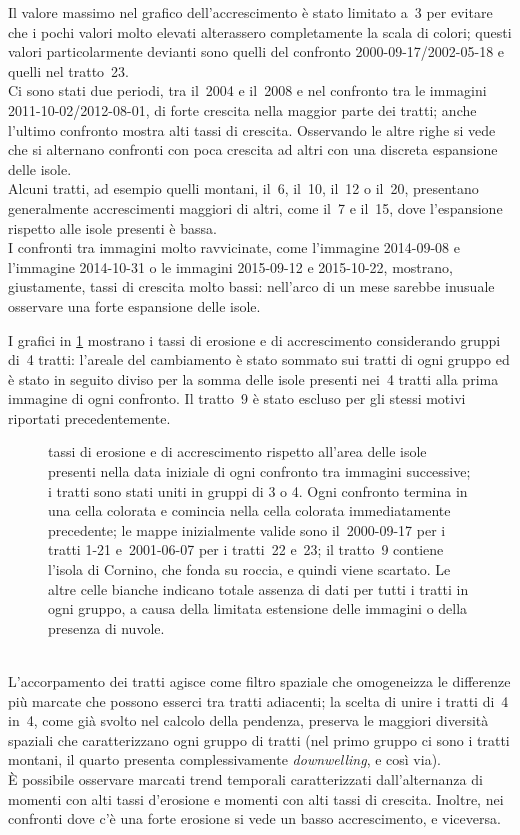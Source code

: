 Il valore massimo nel grafico dell'accrescimento è stato limitato a~\num{3} per evitare che i pochi valori molto elevati alterassero completamente la scala di colori; questi valori particolarmente devianti sono quelli del confronto 2000-09-17/2002-05-18 e quelli nel tratto~23.
\\
Ci sono stati due periodi, tra il~2004 e il~2008 e nel confronto tra le immagini 2011-10-02/2012-08-01, di forte crescita nella maggior parte dei tratti; anche l'ultimo confronto mostra alti tassi di crescita.
Osservando le altre righe si vede che si alternano confronti con poca crescita ad altri con una discreta espansione delle isole.
\\
Alcuni tratti, ad esempio quelli montani, il~6, il~10, il~12 o il~20, presentano generalmente accrescimenti maggiori di altri, come il~7 e il~15, dove l'espansione rispetto alle isole presenti è bassa.
\\
I confronti tra immagini molto ravvicinate, come l'immagine \AST{} 2014-09-08 e l'immagine \Pl{} 2014-10-31 o le immagini \Se{} 2015-09-12 e 2015-10-22, mostrano, giustamente, tassi di crescita molto bassi: nell'arco di un mese sarebbe inusuale osservare una forte espansione delle isole.

I grafici in \cref{graph:eros-accr-4tr-matrix} mostrano i tassi di erosione e di accrescimento considerando gruppi di~4 tratti: l'areale del cambiamento è stato sommato sui tratti di ogni gruppo ed è stato in seguito diviso per la somma delle isole presenti nei~4 tratti alla prima immagine di ogni confronto.
Il tratto~9 è stato escluso per gli stessi motivi riportati precedentemente.
%
\begin{figure}
	\centering
	
	\caption[tassi di erosione e di accrescimento unendo i tratti 4 a 4]{tassi di erosione e di accrescimento rispetto all'area delle isole presenti nella data iniziale di ogni confronto tra immagini successive; i tratti sono stati uniti in gruppi di 3 o 4.
	Ogni confronto termina in una cella colorata e comincia nella cella colorata immediatamente precedente; le mappe inizialmente valide sono il~2000-09-17 per i tratti 1-21 e~2001-06-07 per i tratti~22 e~23; il tratto~9 contiene l'isola di Cornino, che fonda su roccia, e quindi viene scartato.
	Le altre celle bianche indicano totale assenza di dati per tutti i tratti in ogni gruppo, a causa della limitata estensione delle immagini o della presenza di nuvole.}
	\label{graph:eros-accr-4tr-matrix}
\end{figure}
%
\\
L'accorpamento dei tratti agisce come filtro spaziale che omogeneizza le differenze più marcate che possono esserci tra tratti adiacenti; la scelta di unire i tratti di~4 in~4, come già svolto nel calcolo della pendenza, preserva le maggiori diversità spaziali che caratterizzano ogni gruppo di tratti (nel primo gruppo ci sono i tratti montani, il quarto presenta complessivamente \emph{downwelling}, e così via).
\\
È possibile osservare marcati trend temporali caratterizzati dall'alternanza di momenti con alti tassi d'erosione e momenti con alti tassi di crescita.
Inoltre, nei confronti dove c'è una forte erosione si vede un basso accrescimento, e viceversa.

